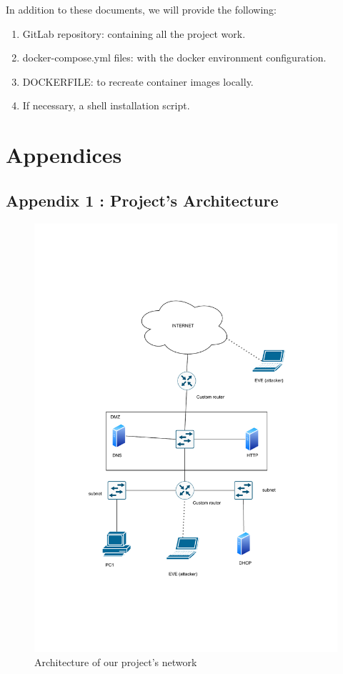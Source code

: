 \documentclass[a4paper,11pt,singlespacing]{article}
\begin{document}
In addition to these documents, we will provide the following:

\begin{enumerate}
    \item GitLab repository: containing all the project work.
    
    \item docker-compose.yml files: with the docker environment configuration.
    
    \item DOCKERFILE: to recreate container images locally.
    
    \item If necessary, a shell installation script.
\end{enumerate}


\newpage
\section{Appendices}


\subsection{Appendix 1 : Project's Architecture}
\label{Appendix1}
\begin{figure}[bp!]
    \centering
    \includegraphics[scale=1.03]{images/architecture_sketch_changed.pdf}
    \caption{Architecture of our project's network}
    \label{fig:1}
\end{figure}
\newpage
\end{document}
